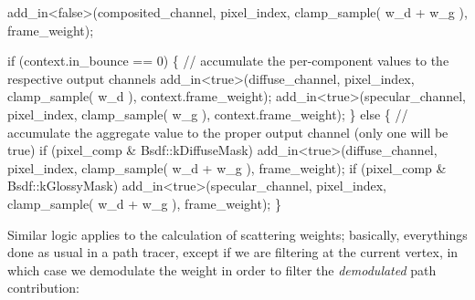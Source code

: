 \begin{DoxyCodeInclude}
                add\_in<false>(composited\_channel, pixel\_index, clamp\_sample( w\_d + w\_g ), frame\_weight);

                \textcolor{keywordflow}{if} (context.in\_bounce == 0)
                \{
                    \textcolor{comment}{// accumulate the per-component values to the respective output channels}
                    add\_in<true>(diffuse\_channel,  pixel\_index, clamp\_sample( w\_d ), context.frame\_weight);
                    add\_in<true>(specular\_channel, pixel\_index, clamp\_sample( w\_g ), context.frame\_weight);
                \}
                \textcolor{keywordflow}{else}
                \{
                    \textcolor{comment}{// accumulate the aggregate value to the proper output channel (only one will be true)}
                    \textcolor{keywordflow}{if} (pixel\_comp & Bsdf::kDiffuseMask) add\_in<true>(diffuse\_channel,  pixel\_index, 
      clamp\_sample( w\_d + w\_g ), frame\_weight);
                    \textcolor{keywordflow}{if} (pixel\_comp & Bsdf::kGlossyMask)  add\_in<true>(specular\_channel, pixel\_index, 
      clamp\_sample( w\_d + w\_g ), frame\_weight);
                \}
\end{DoxyCodeInclude}
 \begin{DoxyParagraph}{}
Similar logic applies to the calculation of scattering weights; basically, everything\textquotesingle{}s done as usual in a path tracer, except if we are filtering at the current vertex, in which case we demodulate the weight in order to filter the {\itshape demodulated} path contribution\+:
\end{DoxyParagraph}

